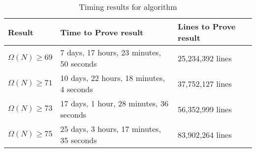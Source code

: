 \documentclass{article}
\begin{document}
\begin{table}
\caption{Timing results for algorithm}
\label{tab:times}
\begin{tabular}{|l|l|l|}
\hline
Result & Time to Prove result & Lines to Prove result\\
\hline
$\Omega(N) \geq 69$ & 
                      7 days, 17 hours, 23 minutes, 50 seconds &
25,234,392 lines \\  %
$\Omega(N) \geq 71$ & 
                      10 days, 22 hours, 18 minutes, 4 seconds & 
37,752,127 lines \\  %
$\Omega(N) \geq 73$ &  
                       17 days, 1 hour, 28 minutes, 36 seconds & 
56,352,999 lines \\   %
$\Omega(N) \geq 75$ &
%
                       25 days, 3 hours, 17 minutes, 35 seconds &  %
83,902,264 lines \\    %



\hline
\end{tabular}
\end{table}
\end{document}
